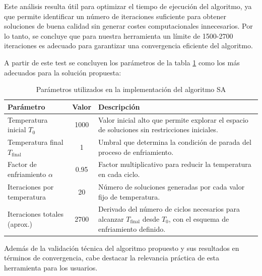 \documentclass[11pt,a4paper]{book}
\begin{document}
Este análisis resulta útil para optimizar el tiempo de ejecución del algoritmo, ya que permite identificar un número de iteraciones suficiente para obtener soluciones de buena calidad sin generar costes computacionales innecesarios. Por lo tanto, se concluye que para nuestra herramienta un límite de 1500-2700 iteraciones es adecuado para garantizar una convergencia eficiente del algoritmo.

A partir de este test se concluyen los parámetros de la tabla \ref{tab:parametros_sa} como los más adecuados para la solución propuesta:
\renewcommand{\arraystretch}{1.2}

\begin{longtable}{>{\raggedright\arraybackslash}p{4.5cm} c >{\raggedright\arraybackslash}p{8cm}}
    \caption{Parámetros utilizados en la implementación del algoritmo SA}%
    \label{tab:parametros_sa} \\
    \toprule
    \textbf{Parámetro} & \textbf{Valor} & \textbf{Descripción} \\
    \midrule
    Temperatura inicial \( T_0 \) & 1000 & Valor inicial alto que permite explorar el espacio de soluciones sin restricciones iniciales. \\
    Temperatura final \( T_{\text{final}} \) & 1 & Umbral que determina la condición de parada del proceso de enfriamiento. \\
    Factor de enfriamiento \( \alpha \) & 0.95 & Factor multiplicativo para reducir la temperatura en cada ciclo. \\
    Iteraciones por temperatura & 20 & Número de soluciones generadas por cada valor fijo de temperatura. \\
    Iteraciones totales (aprox.) & 2700 & Derivado del número de ciclos necesarios para alcanzar \( T_{\text{final}} \) desde \( T_0 \), con el esquema de enfriamiento definido.\footnotemark \\
    \bottomrule
\end{longtable}


Además de la validación técnica del algoritmo propuesto y sus resultados en términos de convergencia, cabe destacar la relevancia práctica de esta herramienta para los usuarios.
\end{document}
